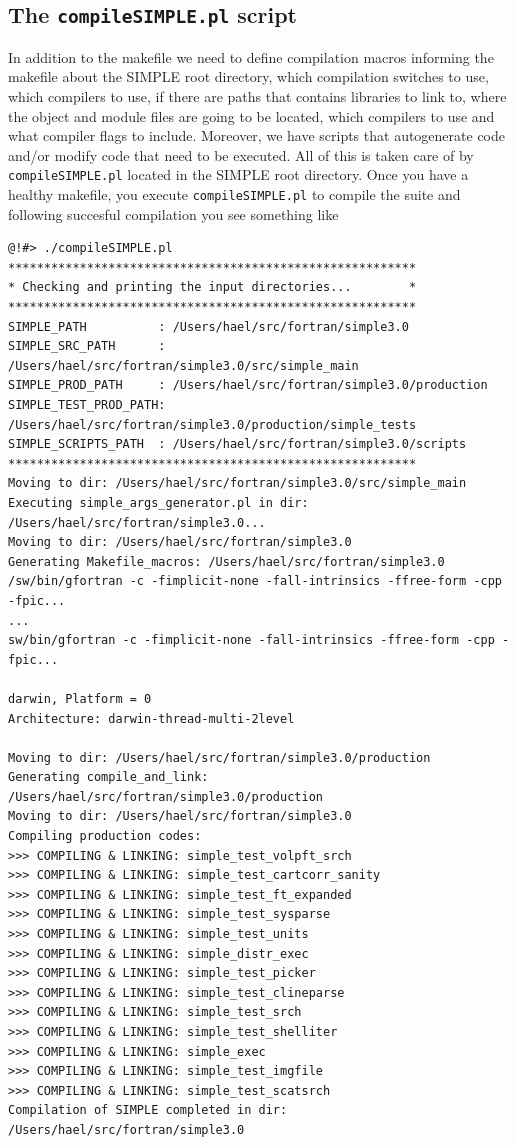 \documentclass[a4paper,11pt]{article}
\begin{document}
\subsection{The \texttt{compileSIMPLE.pl} script}
In addition to the makefile we need to define compilation macros informing the makefile about the SIMPLE root directory, which compilation switches to use, which compilers to use, if there are paths that contains libraries to link to, where the object and module files are going to be located, which compilers to use and what compiler flags to include. Moreover, we have scripts that autogenerate code and/or modify code that need to be executed. All of this is taken care of by \texttt{compileSIMPLE.pl} located in the SIMPLE root directory. Once you have a healthy makefile, you execute \texttt{compileSIMPLE.pl} to compile the suite and following succesful compilation you see something like
\begin{verbatim}
@!#> ./compileSIMPLE.pl 
*********************************************************
* Checking and printing the input directories...        *
*********************************************************
SIMPLE_PATH          : /Users/hael/src/fortran/simple3.0
SIMPLE_SRC_PATH      : /Users/hael/src/fortran/simple3.0/src/simple_main
SIMPLE_PROD_PATH     : /Users/hael/src/fortran/simple3.0/production
SIMPLE_TEST_PROD_PATH: /Users/hael/src/fortran/simple3.0/production/simple_tests
SIMPLE_SCRIPTS_PATH  : /Users/hael/src/fortran/simple3.0/scripts
*********************************************************
Moving to dir: /Users/hael/src/fortran/simple3.0/src/simple_main
Executing simple_args_generator.pl in dir: /Users/hael/src/fortran/simple3.0...
Moving to dir: /Users/hael/src/fortran/simple3.0
Generating Makefile_macros: /Users/hael/src/fortran/simple3.0
/sw/bin/gfortran -c -fimplicit-none -fall-intrinsics -ffree-form -cpp -fpic...
...
sw/bin/gfortran -c -fimplicit-none -fall-intrinsics -ffree-form -cpp -fpic... 

darwin, Platform = 0
Architecture: darwin-thread-multi-2level

Moving to dir: /Users/hael/src/fortran/simple3.0/production
Generating compile_and_link: /Users/hael/src/fortran/simple3.0/production
Moving to dir: /Users/hael/src/fortran/simple3.0
Compiling production codes:
>>> COMPILING & LINKING: simple_test_volpft_srch
>>> COMPILING & LINKING: simple_test_cartcorr_sanity
>>> COMPILING & LINKING: simple_test_ft_expanded
>>> COMPILING & LINKING: simple_test_sysparse
>>> COMPILING & LINKING: simple_test_units
>>> COMPILING & LINKING: simple_distr_exec
>>> COMPILING & LINKING: simple_test_picker
>>> COMPILING & LINKING: simple_test_clineparse
>>> COMPILING & LINKING: simple_test_srch
>>> COMPILING & LINKING: simple_test_shelliter
>>> COMPILING & LINKING: simple_exec
>>> COMPILING & LINKING: simple_test_imgfile
>>> COMPILING & LINKING: simple_test_scatsrch
Compilation of SIMPLE completed in dir: /Users/hael/src/fortran/simple3.0
\end{verbatim}
\end{document}
